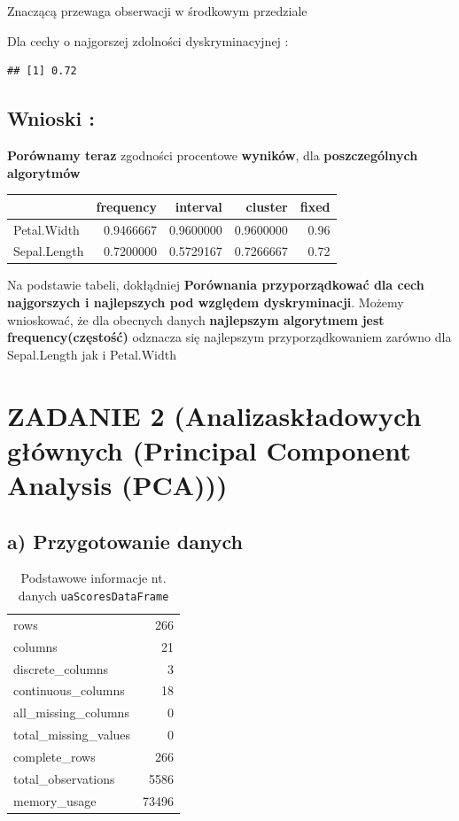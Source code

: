 \documentclass[
  12pt,
]{article}
\begin{document}
Znaczącą przewaga obserwacji w środkowym przedziale

Dla cechy o najgorszej zdolności dyskryminacyjnej :

\begin{verbatim}
## [1] 0.72
\end{verbatim}

\subsection{Wnioski :}\label{wnioski}

\textbf{Porównamy teraz} zgodności procentowe \textbf{wyników}, dla
\textbf{poszczególnych algorytmów}

\begin{longtable}[]{@{}lrrrr@{}}
\toprule\noalign{}
& frequency & interval & cluster & fixed \\
\midrule\noalign{}
\endhead
\bottomrule\noalign{}
\endlastfoot
Petal.Width & 0.9466667 & 0.9600000 & 0.9600000 & 0.96 \\
Sepal.Length & 0.7200000 & 0.5729167 & 0.7266667 & 0.72 \\
\end{longtable}

Na podstawie tabeli, dokłądniej \textbf{Porównania przyporządkować dla
cech najgorszych i najlepszych pod względem dyskryminacji}. Możemy
wnioskować, że dla obecnych danych \textbf{najlepszym algorytmem}
\textbf{jest frequency(częstość)} odznacza się najlepszym
przyporządkowaniem zarówno dla Sepal.Length jak i Petal.Width

\section{ZADANIE 2 (Analizaskładowych głównych (Principal Component
Analysis
(PCA)))}\label{zadanie-2-analizaskux142adowych-gux142uxf3wnych-principal-component-analysis-pca}

\subsection{a) Przygotowanie danych}\label{a-przygotowanie-danych}

\begin{longtable}[]{@{}lr@{}}
\caption{Podstawowe informacje nt. danych
\texttt{uaScoresDataFrame}}\tabularnewline
\toprule\noalign{}
\endfirsthead
\endhead
\bottomrule\noalign{}
\endlastfoot
rows & 266 \\
columns & 21 \\
discrete\_columns & 3 \\
continuous\_columns & 18 \\
all\_missing\_columns & 0 \\
total\_missing\_values & 0 \\
complete\_rows & 266 \\
total\_observations & 5586 \\
memory\_usage & 73496 \\
\end{longtable}
\end{document}
